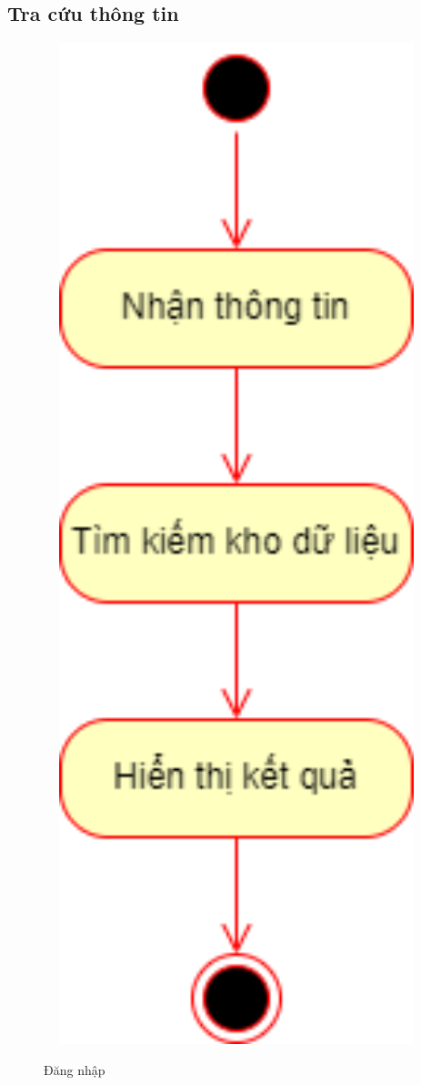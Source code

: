 \subsection{Tra cứu thông tin}
  \begin{center}
    \includegraphics[width=1.1\textwidth]{image/activity/search_info.png}
    \begin{figure}
      \centering
      \caption{Đăng nhập}
    \end{figure}
  \end{center}
